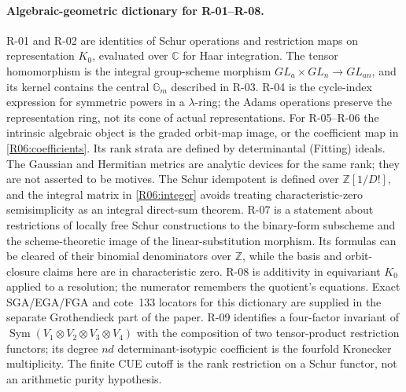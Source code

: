 \paragraph{Algebraic-geometric dictionary for R-01--R-08.}
R-01 and R-02 are identities of Schur operations and restriction maps
on representation $K_0$, evaluated over $\mathbb C$ for Haar integration.
The tensor homomorphism is the integral group-scheme morphism
$GL_a\times GL_n\to GL_{an}$, and its kernel contains the central
$\mathbb G_m$ described in R-03. R-04 is the cycle-index expression
for symmetric powers in a $\lambda$-ring; the Adams operations preserve
the representation ring, not its cone of actual representations.
For R-05--R-06 the intrinsic algebraic object is the graded orbit-map
image, or the coefficient map in \eqref{R06:coefficients}. Its rank
strata are defined by determinantal (Fitting) ideals. The Gaussian
and Hermitian metrics are analytic devices for the same rank; they
are not asserted to be motives. The Schur idempotent is defined over
$\mathbb Z[1/D!]$, and the integral matrix in \eqref{R06:integer}
avoids treating characteristic-zero semisimplicity as an integral
direct-sum theorem. R-07 is a statement about restrictions of locally
free Schur constructions to the binary-form subscheme and the
scheme-theoretic image of the linear-substitution morphism. Its
formulas can be cleared of their binomial denominators over
$\mathbb Z$, while the basis and orbit-closure claims here are in
characteristic zero. R-08 is additivity in equivariant $K_0$ applied
to a resolution; the numerator remembers the quotient's equations.
Exact SGA/EGA/FGA and cote~133 locators for this dictionary are supplied
in the separate Grothendieck part of the paper.
R-09 identifies a four-factor invariant of
$\operatorname{Sym}(V_1\otimes V_2\otimes V_3\otimes V_4)$ with the
composition of two tensor-product restriction functors; its degree
$nd$ determinant-isotypic coefficient is the fourfold Kronecker
multiplicity. The finite CUE cutoff is the rank restriction on a
Schur functor, not an arithmetic purity hypothesis.
